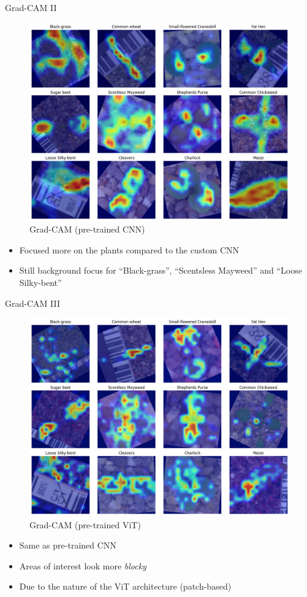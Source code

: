 \documentclass{beamer}
\begin{document}
\begin{frame}{Grad-CAM II}
    \begin{figure}
        \includegraphics[width=0.4\linewidth]{../resources/resnet/grad_cam.png}
        \caption{Grad-CAM (pre-trained CNN)}\label{fig:grad-cam-pretrained-cnn}
    \end{figure}

    \begin{itemize}
        \item Focused more on the plants compared to the custom CNN
        \item Still background focus for ``Black-grass'', ``Scentsless Mayweed'' and ``Loose Silky-bent''
    \end{itemize}
\end{frame}

\begin{frame}{Grad-CAM III}
    \begin{figure}
        \includegraphics[width=0.4\linewidth]{../resources/vit/grad_cam.png}
        \caption{Grad-CAM (pre-trained ViT)}\label{fig:grad-cam-pretrained-vit}
    \end{figure}

    \begin{itemize}
        \item Same as pre-trained CNN
        \item Areas of interest look more \textit{blocky}
        \item Due to the nature of the ViT architecture (patch-based)
    \end{itemize}
\end{frame}
\end{document}
